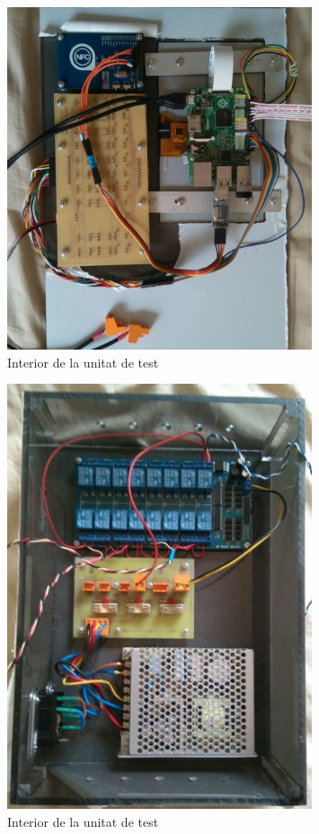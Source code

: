 \begin{figure}
\center
\includegraphics[width=0.8\textwidth]{images/demonstrator_back}
\caption{Interior de la unitat de test}
\label{fig:demonstrator_diagram}
\end{figure}

\begin{figure}
\center
\includegraphics[width=0.8\textwidth]{images/demonstrator_bottom}
\caption{Interior de la unitat de test}
\label{fig:demonstrator_diagram}
\end{figure}

